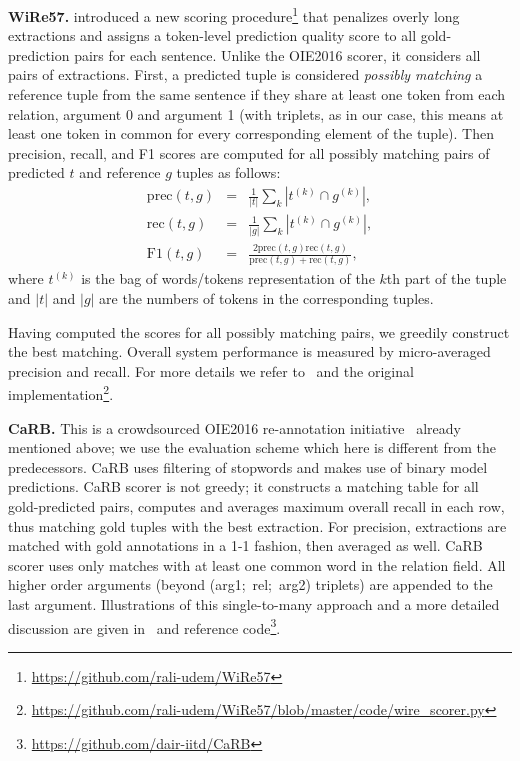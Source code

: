 \documentclass[letterpaper]{article} \usepackage{aaai22}  \usepackage{times}  \usepackage{helvet}  \usepackage{courier}  \usepackage[hyphens]{url}  \usepackage{graphicx} \usepackage{placeins}
\begin{document}
\textbf{WiRe57.} \citet{lechelle2019wire57} introduced a new scoring procedure\footnote{\url{https://github.com/rali-udem/WiRe57}}
that penalizes overly long extractions and assigns a token-level prediction quality score to all gold-prediction pairs for each sentence. Unlike the OIE2016 scorer, it considers all pairs of extractions.
First, a predicted tuple is considered \textit{possibly matching} a reference tuple from the same sentence if they share at least one token from each relation, argument 0 and argument 1 (with triplets, as in our case, this means at least one token in common for every corresponding element of the tuple). Then precision, recall, and F1 scores are computed for all possibly matching pairs of predicted $t$ and reference $g$ tuples as follows:
$$\begin{array}{rcl}
    \mathrm{prec}(t, g) &=& \frac{1}{|t|}\sum_k{|t^{(k)} \cap g^{(k)}|},\\
    \mathrm{rec}(t, g) &=& \frac{1}{|g|}{\sum_k{|t^{(k)} \cap g^{(k)}|}},\\
    \mathrm{F1}(t, g) &=& \frac{2\mathrm{prec}(t, g)\mathrm{rec}(t, g)}{\mathrm{prec}(t, g)+\mathrm{rec}(t, g)},
\end{array}$$
where $t^{(k)}$ is the bag of words/tokens representation of the $k$th part of the tuple and $|t|$ and $|g|$ are the numbers of tokens in the corresponding tuples.

Having computed the scores for all possibly matching pairs, we greedily construct the best matching. Overall system performance is measured by micro-averaged precision and recall. For more details we refer to~\cite{lechelle2019wire57} and the original implementation\footnote{\url{https://github.com/rali-udem/WiRe57/blob/master/code/wire_scorer.py}}.

\textbf{CaRB.} This is a crowdsourced OIE2016 re-annotation initiative~\cite{bhardwaj-etal-2019-carb} already mentioned above; we use the evaluation scheme which here is different from the predecessors. CaRB uses filtering of stopwords and makes use of binary model predictions. 
CaRB scorer is not greedy; it constructs a matching table for all gold-predicted pairs, computes and averages maximum overall recall in each row, thus matching gold tuples with the best extraction. For precision, extractions are matched with gold annotations in a 1-1 fashion, then averaged as well. 
CaRB scorer uses only matches with at least one common word in the relation field. All higher order arguments (beyond (arg1;~rel;~arg2) triplets) are appended to the last argument. Illustrations of this single-to-many approach and a more detailed discussion are given in~\cite{bhardwaj-etal-2019-carb} and reference code\footnote{\url{https://github.com/dair-iitd/CaRB}}.
\end{document}
